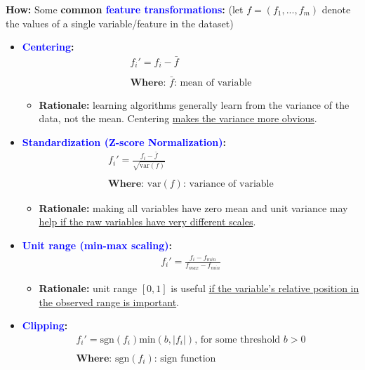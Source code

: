 \documentclass[12pt, a4paper]{article}
\begin{document}
\textbf{How:} Some \textbf{common \textcolor{blue}{feature transformations}:} (let $f=(f_1,...,f_m)$ denote the values of a single variable/feature in the dataset)
\begin{itemize}
  \item \textbf{\textcolor{blue}{Centering}:}
  \begin{gather*}
    f_i' = f_i - \bar{f} \\ \\
    \textbf{Where: } \textbf{$\bar{f}$: } \text{mean of variable}
  \end{gather*}
  \begin{itemize}
    \item \textbf{Rationale:} learning algorithms generally learn from the variance of the data, not the mean. Centering \uline{makes the variance more obvious}.
  \end{itemize}
  \item \textbf{\textcolor{blue}{Standardization (Z-score Normalization)}:}
  \begin{gather*}
    f_i' = \frac{f_i - \bar{f}}{\sqrt{\text{var}(f)}} \\ \\
    \textbf{Where: } \text{$\text{var}(f)$: } \text{variance of variable}
  \end{gather*}
  \begin{itemize}
    \item \textbf{Rationale:} making all variables have zero mean and unit variance may \uline{help if the raw variables have very different scales}.
  \end{itemize}
  \item \textbf{\textcolor{blue}{Unit range (min-max scaling)}:}
  \begin{gather*}
    f_i' = \frac{f_i - f_{min}}{f_{max}-f_{min}}
  \end{gather*}
  \begin{itemize}
    \item \textbf{Rationale:} unit range $[0,1]$ is useful \uline{if the variable's relative position in the observed range is important}.
  \end{itemize}
  \item \textbf{\textcolor{blue}{Clipping}:}
  \begin{gather*}
    f_i' = \text{sgn}(f_i) \text{min}(b, |f_i|) \text{, for some threshold } b > 0 \\ \\
    \textbf{Where: } \text{$\text{sgn}(f_i)$: } \text{sign function}

\end{gather*}
\end{itemize}
\end{document}

